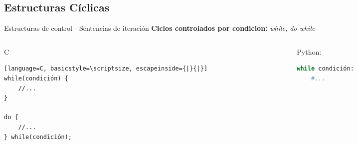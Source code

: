 \documentclass{beamer}
\begin{document}
\subsection{Estructuras Cíclicas}
\begin{frame}[fragile]{Estructuras de control - Sentencias de iteración}
\textbf{Ciclos controlados por condicion:} \emph{while, do-while}\\
\small
\begin{columns}[t]
	\begin{column}{5cm}
	\begin{exampleblock}{C}
	\begin{lstlisting}[language=C, basicstyle=\scriptsize, escapeinside={|}{|}] 
while(condición) { 
    //...
}

do {
    //...
} while(condición);
		\end{lstlisting}\end{exampleblock}
	\end{column}
	\begin{column}{5cm}
	\begin{block}{Python:}
		\begin{lstlisting}[language=Python, basicstyle=\scriptsize]
while condición: 
    #...
		\end{lstlisting}\end{block}
	\end{column}
\end{columns}
\end{frame}
\end{document}
